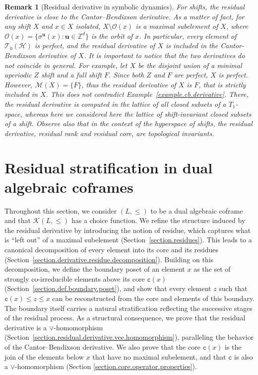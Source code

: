\documentclass{article}
\newtheorem{remark}[theorem]{Remark}
\begin{document}
\begin{remark}[Residual derivative in symbolic dynamics]
For shifts, the %
residual derivative is close to the %
Cantor--Bendixson derivative. 
As a matter of fact, for any shift \(X\) and \(x\in X\) isolated, 
\(X\setminus \mathcal{O}(x)\) is a maximal subelement of \(X\), where \(\mathcal{O}(x)=\{\sigma^{\mathbf{u}}(x):\mathbf{u}\in\mathbb{Z}^d\}\) %
is the orbit of \(x\). 
In particular, every element of \(\mathcal{T}_0(\mathcal{H})\) is perfect, and the residual derivative of $X$ is included in the Cantor-Bendixson derivative of $X$. 
It is important to notice that the two derivatives do not coincide in general. For example, let \(X\) be the disjoint union of a minimal aperiodic $Z$ shift and a full shift $F$. Since both $Z$ and $F$ are perfect, \(X\) is perfect. However, $\mathcal{M}(X) = \{F\}$, thus the residual derivative of $X$ is $F$, that is strictly included in \(X\). This does not contradict Example~\ref{example.cb.derivative}. There, the residual derivative is computed in the lattice of all closed subsets of a \(T_1\)-space, whereas here we considered here the lattice of shift-invariant closed
subsets of a shift. Observe also that in the context of the hyperspace of shifts, the residual derivative, residual rank and  residual core, are topological invariants.
\end{remark}%

\section{Residual stratification in dual algebraic coframes\label{section.decomposition}}

Throughout this section, we consider $(L,\le)$ to be a {dual algebraic} coframe {and that $\mathcal{K}(L,\le)$ has a choice function}. We refine the structure induced by the residual derivative by introducing the notion of residue, which captures what is “left out” of a maximal subelement (Section~\ref{section.residues}). This leads to a canonical decomposition of every element into its core and its residues (Section~\ref{section.derivative.residue.decomposition}). Building on this decomposition, we define the boundary poset of an element $x$ as the set of strongly co-irreducible elements above its core $\texttt{c}(x)$ (Section~\ref{section.def.boundary.poset}), and show that every element $z$ such that $\texttt{c}(x) \le z \le x$ can be reconstructed from the core and elements of this boundary. The boundary itself carries a natural stratification reflecting the successive stages of the residual process. As a structural consequence, we prove that the residual derivative is a $\vee$-homomorphism (Section~\ref{section.residual.derivative.vee.homomorphism}), paralleling the behavior of the Cantor–Bendixson derivative. {We also prove that the core $\texttt{c}(x)$ is the join of the elements below $x$ that have no maximal subelement, and that $\texttt{c}$ is also a $\vee$-homomorphism (Section \ref{section.core.operator.properties})}.
\end{document}
